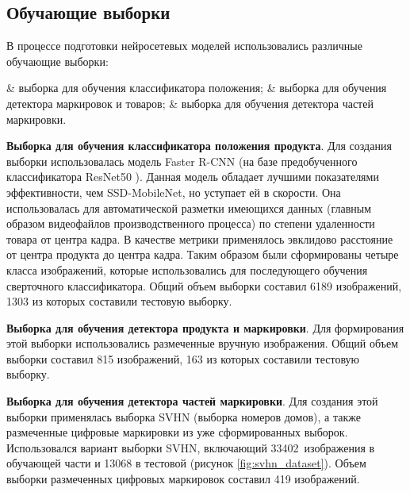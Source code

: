 \subsection{Обучающие выборки}

В процессе подготовки нейросетевых моделей использовались различные обучающие выборки:

\begin{easylist}
	& выборка для обучения классификатора положения;
	& выборка для обучения детектора маркировок и товаров;
	& выборка для обучения детектора частей маркировки.
\end{easylist} 

\textbf{Выборка для обучения классификатора положения продукта}. Для создания выборки использовалась модель Faster R-CNN \cite[c.~3]{ren} (на базе  предобученного классификатора ResNet50 \cite[c.~6]{he}). Данная модель обладает лучшими показателями эффективности, чем SSD-MobileNet, но уступает ей в скорости. Она использовалась для автоматической разметки имеющихся данных (главным образом видеофайлов производственного процесса) по степени удаленности товара от центра кадра. В качестве метрики применялось эвклидово расстояние от центра продукта до центра кадра. Таким образом были сформированы четыре класса изображений, которые использовались для последующего обучения сверточного классификатора. Общий объем выборки составил 6189 изображений, 1303 из которых составили тестовую выборку.

\textbf{Выборка для обучения детектора продукта и маркировки}. Для формирования этой выборки использовались размеченные вручную изображения. Общий объем выборки составил 815 изображений, 163 из которых составили тестовую выборку.


\textbf{Выборка для обучения детектора частей маркировки}. Для создания этой выборки применялась выборка SVHN \cite[c.~3]{netzer} (выборка номеров домов), а также размеченные цифровые маркировки из уже сформированных выборок. Использовался вариант выборки SVHN, включающий 33402~изображения в обучающей части и 13068 в тестовой (рисунок \ref{fig:svhn_dataset}). Объем выборки размеченных цифровых маркировок составил 419 изображений.

